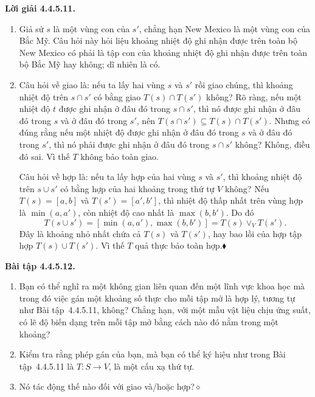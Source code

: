\noindent\textbf{Lời giải 4.4.5.11.}\keepwithnext
\begin{enumerate}[label=\alph*.]
\item Giả sử $s$ là một vùng con của $s'$, chẳng hạn New Mexico là một vùng con của Bắc Mỹ. Câu hỏi này hỏi liệu khoảng nhiệt độ ghi nhận được trên toàn bộ New Mexico có phải là tập con của khoảng nhiệt độ ghi nhận được trên toàn bộ Bắc Mỹ hay không; dĩ nhiên là có.
\item Câu hỏi về giao là: nếu ta lấy hai vùng $s$ và $s'$ rồi giao chúng, thì khoảng nhiệt độ trên $s\cap s'$ có bằng giao $T(s)\cap T(s')$ không? Rõ ràng, nếu một nhiệt độ $t$ được ghi nhận ở đâu đó trong $s\cap s'$, thì nó được ghi nhận ở đâu đó trong $s$ và ở đâu đó trong $s'$, nên $T(s\cap s')\subseteq T(s)\cap T(s')$. Nhưng có đúng rằng nếu một nhiệt độ được ghi nhận ở đâu đó trong $s$ và ở đâu đó trong $s'$, thì nó phải được ghi nhận ở đâu đó trong $s\cap s'$ không? Không, điều đó sai. Vì thế $T$ không bảo toàn giao.

Câu hỏi về hợp là: nếu ta lấy hợp của hai vùng $s$ và $s'$, thì khoảng nhiệt độ trên $s\cup s'$ có bằng hợp của hai khoảng trong thứ tự $V$ không? Nếu $T(s)=[a,b]$ và $T(s')=[a',b']$, thì nhiệt độ thấp nhất trên vùng hợp là $\min(a,a')$, còn nhiệt độ cao nhất là $\max(b,b')$. Do đó
\[
T(s\cup s')=[\min(a,a'),\max(b,b')]=T(s)\vee_V T(s').
\]
Đây là khoảng nhỏ nhất chứa cả $T(s)$ và $T(s')$, hay bao lồi của hợp tập hợp $T(s)\cup T(s')$. Vì thế $T$ quả thực bảo toàn hợp.\nobreak\hfill$\blacklozenge$
\end{enumerate}

\noindent\textbf{Bài tập 4.4.5.12.}\keepwithnext
\begin{enumerate}[label=\alph*.]
\item Bạn có thể nghĩ ra một không gian liên quan đến một lĩnh vực khoa học mà trong đó việc gán một khoảng số thực cho mỗi tập mở là hợp lý, tương tự như Bài tập~4.4.5.11, không? Chẳng hạn, với một mẫu vật liệu chịu ứng suất, có lẽ độ biến dạng trên mỗi tập mở bằng cách nào đó nằm trong một khoảng?
\item Kiểm tra rằng phép gán của bạn, mà bạn có thể ký hiệu như trong Bài tập~4.4.5.11 là $T:S\to V$, là một cấu xạ thứ tự.
\item Nó tác động thế nào đối với giao và/hoặc hợp?\nobreak\hfill$\diamond$
\end{enumerate}

